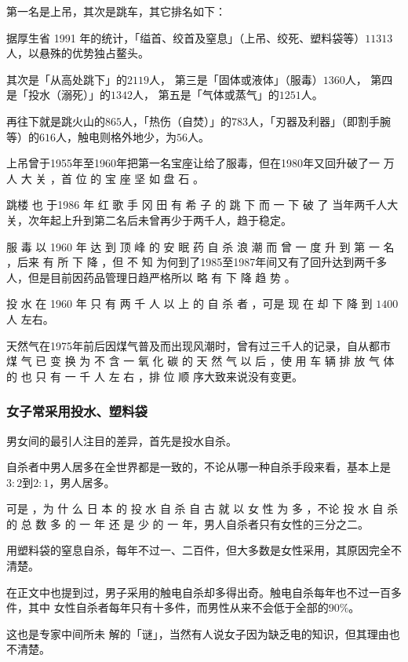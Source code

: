 \documentclass[UTF8]{ctexart}
\begin{document}
第一名是上吊，其次是跳车，其它排名如下：

据厚生省 1991 年的统计，「缢首、绞首及窒息」（上吊、绞死、塑料袋等）$11313$ 人，以悬殊的优势独占鳌头。

其次是「从高处跳下」的$2119$人，
第三是「固体或液体」（服毒）$1360$人，
第四是「投水（溺死）」的$1342$人，
第五是「气体或蒸气」的$1251$人。

再往下就是跳火山的$865$人，「热伤（自焚）」的$783$人，「刃器及利器」（即割手腕等）的$616$人，触电则格外地少，为$56$人。

上吊曾于1955年至1960年把第一名宝座让给了服毒，但在1980年又回升破了一 万 人 大 关 ，首 位 的 宝 座 坚 如 盘 石 。

跳楼 也 于1986 年 红 歌 手 冈 田 有 希 子 的 跳 下 而 一 下 破 了 当年两千人大关，次年起上升到第二名后未曾再少于两千人，趋于稳定。

服 毒 以 1960 年 达 到 顶 峰 的 安 眠 药 自 杀 浪 潮 而 曾 一 度 升 到 第 一 名 ，后来 有 所 下 降 ，但 不 知 为何到了1985至1987年间又有了回升达到两千多人，但是目前因药品管理日趋严格所以 略 有 下 降 趋 势 。

投 水 在 1960 年 只 有 两 千 人 以 上 的 自 杀 者 ，可是 现 在 却 下 降 到 $1400$ 人 左右。

天然气在1975年前后因煤气普及而出现风潮时，曾有过三千人的记录，自从都市 煤 气 已 变 换 为 不 含 一 氧 化 碳 的 天 然 气 以 后 ，使 用 车 辆 排 放 气 体 的 也 只 有 一 千 人 左 右 ，排 位 顺 序大致来说没有变更。

\subsubsection*{女子常采用投水、塑料袋}

男女间的最引人注目的差异，首先是投水自杀。

自杀者中男人居多在全世界都是一致的，不论从哪一种自杀手段来看，基本上是$3:2$到$2:1$，男人居多。

可是 ，为 什 么 日 本 的 投 水 自 杀 自 古 就 以 女 性 为 多 ，不论 投 水 自 杀 的 总 数 多 的 一 年 还 是 少 的 一 年，男人自杀者只有女性的三分之二。

用塑料袋的窒息自杀，每年不过一、二百件，但大多数是女性采用，其原因完全不清楚。

在正文中也提到过，男子采用的触电自杀却多得出奇。触电自杀每年也不过一百多件，其中 女性自杀者每年只有十多件，而男性从来不会低于全部的$90\%$。

这也是专家中间所未 解的「谜」，当然有人说女子因为缺乏电的知识，但其理由也不清楚。
\end{document}

